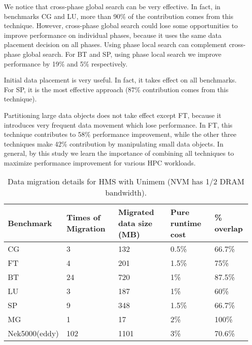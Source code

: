 We notice that cross-phase global search can be very effective.
In fact, in benchmarks CG and LU, 
more than 90\% of the contribution comes from this technique.
However, cross-phase global search could lose some opportunities to improve performance on individual phases, because it uses the same data placement decision on all phases. Using phase local search can complement cross-phase global search. For BT and SP, using phase local search we improve performance 
by 19\% and 5\% respectively. 

Initial data placement is very useful. In fact, it takes effect on all benchmarks. For SP, it is the most effective approach (87\% contribution comes from this technique). 

Partitioning large data objects does not take effect except FT,
because it introduces very frequent data movement which lose performance.
In FT, this technique contributes to 58\% performance improvement,
while the other three techniques make 42\% contribution by manipulating
small data objects. In general, by this study we learn the importance of combining all techniques to maximize performance improvement for various HPC workloads.


\begin{table}
        \begin{center}
        \caption{Data migration details for HMS with Unimem (NVM has 1/2 DRAM bandwidth).}
        \vspace{-10pt}
        \label{tab:data_mig_details}
        \tiny
        \begin{tabular}{|p{1.2cm}|p{1.3cm}|p{2cm}|p{1.5cm}|p{0.8cm}|}
        \hline
        \textbf{Benchmark}    & \textbf{Times of Migration}  & \textbf{Migrated data size (MB)} &\textbf{Pure runtime cost} & \textbf{\% overlap}                                  \\ \hline \hline
         CG & 3 & 132 & 0.5\% & 66.7\%   \\ \hline
         FT & 4 & 201 & 1.5\% & 75\%   \\ \hline
         BT & 24 & 720 & 1\% & 87.5\%   \\ \hline 
         LU & 3 & 187 & 1\% & 60\%     \\ \hline
         SP & 9 & 348 & 1.5\% & 66.7\% \\ \hline
         MG & 1 & 17 & 2\%	& 100\%				\\ \hline
         Nek5000(eddy) & 102 & 1101 & 3\% & 70.6\% \\ \hline
        \end{tabular}
        \end{center}
        \vspace{-15pt}
\end{table}

